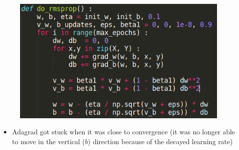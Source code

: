 \begin{frame}
	\begin{columns}
		\begin{overlayarea}{\textwidth}{\textheight}
			
			\begin{figure}
				\includegraphics[scale=0.4]{images/module9/pseudo_code_rmsprop_crop.png}
			\end{figure}
			 {\begin{itemize}\justifying
				\item {Adagrad got stuck when it was close to convergence} \onslide<30-> {(it was no longer able to move in the vertical ($b$) direction because of the decayed learning rate)}
				\end{itemize}}
		\end{overlayarea}
		
		\begin{overlayarea}{\textwidth}{\textheight}
			

\end{overlayarea}
\end{columns}
\end{frame}
